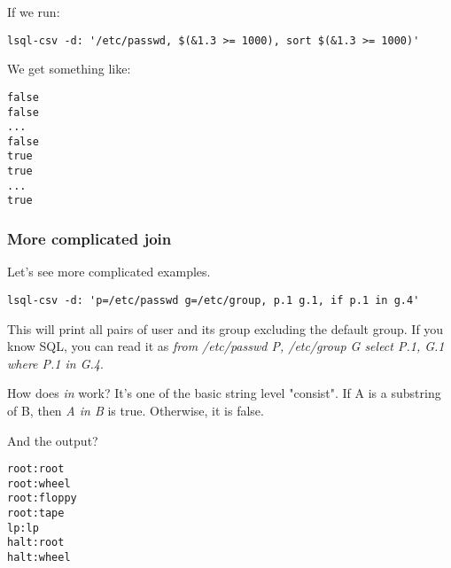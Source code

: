 If we run:
\begin{verbatim}
lsql-csv -d: '/etc/passwd, $(&1.3 >= 1000), sort $(&1.3 >= 1000)'
\end{verbatim}

We get something like:
\begin{verbatim}
false
false
...
false
true
true
...
true
\end{verbatim}

\subsubsection{More complicated join}
Let's see more complicated examples.
\begin{verbatim}
lsql-csv -d: 'p=/etc/passwd g=/etc/group, p.1 g.1, if p.1 in g.4'
\end{verbatim}
This will print all pairs of user and its group excluding the default group. If you know SQL, you can read it as \textit{from /etc/passwd P, /etc/group G select P.1, G.1 where P.1 in G.4}.

How does \textit{in} work? It's one of the basic string level "consist". If A is a substring of B, then \textit{A in B} is true. Otherwise, it is false.

And the output?
\begin{verbatim}
root:root                                                                                                                                                                                                                                                                 
root:wheel                                                                                                                                                                                                                                                                
root:floppy                                                                                                                                                                                                                                                               
root:tape                                                                                                                                                                                                                                                                 
lp:lp                                                                                                                                                                                                                                                                     
halt:root                                                                                                                                                                                                                                                                 
halt:wheel 
\end{verbatim}

